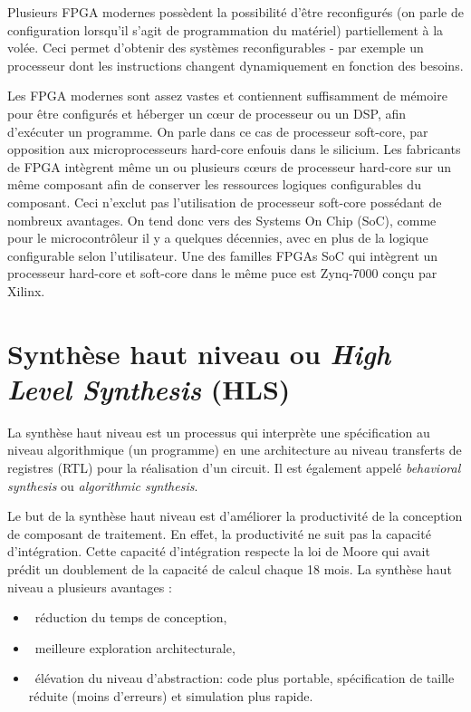 Plusieurs FPGA modernes possèdent la possibilité d'être reconfigurés 
(on parle de configuration lorsqu'il s'agit de programmation du matériel) partiellement à la volée. 
Ceci permet d'obtenir des systèmes reconfigurables - par exemple un processeur dont 
les instructions changent dynamiquement en fonction des besoins.

Les FPGA modernes sont assez vastes et contiennent suffisamment de mémoire pour être configurés 
et héberger un cœur de processeur ou un DSP, afin d'exécuter un programme. 
On parle dans ce cas de processeur soft-core, par opposition aux microprocesseurs hard-core enfouis dans le silicium. 
Les fabricants de FPGA intègrent même un ou plusieurs cœurs de processeur hard-core 
sur un même composant afin de conserver les ressources logiques configurables du composant. 
Ceci n'exclut pas l'utilisation de processeur soft-core possédant de nombreux avantages. 
On tend donc vers des Systems On Chip (\gls{SoC}), comme pour le microcontrôleur il y a quelques décennies, 
avec en plus de la logique configurable selon l'utilisateur. Une des familles FPGAs SoC
qui intègrent un processeur hard-core et soft-core dans le même puce est Zynq-7000\cite{ug585} conçu par Xilinx.

\section{Synthèse haut niveau ou \emph{High Level Synthesis} (HLS)}
\label{sec:hls}
La synthèse haut niveau est un processus qui interprète une spécification au niveau algorithmique (un programme) en une architecture
au niveau transferts de registres (\gls{RTL}) pour la réalisation d'un circuit\cite{Vijay1996}.
Il est également appelé \emph{behavioral synthesis} ou \emph{algorithmic synthesis}.

Le but de la synthèse haut niveau est d'améliorer la productivité de la conception 
de composant de traitement. En effet, la productivité ne suit pas la capacité d'intégration. Cette capacité d'intégration
respecte la loi de Moore qui avait prédit un doublement de la capacité de calcul chaque 18 mois.
La synthèse haut niveau a plusieurs avantages :
\begin{itemize}
	\item\ réduction du temps de conception,
	\item\ meilleure exploration architecturale,
	\item\ élévation du niveau d'abstraction: code plus portable, spécification de taille réduite (moins d'erreurs) et simulation plus rapide.
\end{itemize}

